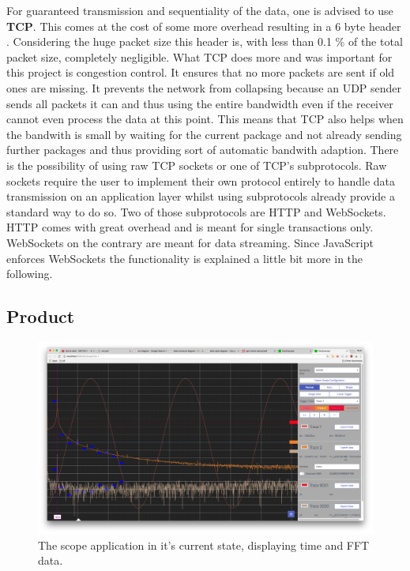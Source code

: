 For guaranteed transmission and sequentiality of the data, one is advised to use \textbf{TCP}. This comes at the cost of some more overhead resulting in a 6 byte header \cite{TODO: refrence}. Considering the huge packet size this header is, with less than 0.1 \% of the total packet size, completely negligible. What TCP does more and was important for this project is congestion control. It ensures that no more packets are sent if old ones are missing. It prevents the network from collapsing because an UDP sender sends all packets it can and thus using the entire bandwidth even if the receiver cannot even process the data at this point.
This means that TCP also helps when the bandwith is small by waiting for the current package and not already sending further packages and thus providing sort of automatic bandwith adaption.
There is the possibility of using raw TCP sockets or one of TCP's subprotocols. Raw sockets require the user to implement their own protocol entirely to handle data transmission on an application layer whilst using subprotocols already provide a standard way to do so.
Two of those subprotocols are HTTP and WebSockets. HTTP comes with great overhead and is meant for single transactions only.
WebSockets on the contrary are meant for data streaming.
Since JavaScript enforces WebSockets the functionality is explained a little bit more in the following.

%
%

\subsection{Product}

\begin{figure}
    \centering
    \includegraphics[width=\textwidth]{images/gui/scope}
    \caption[The scope application]{%
        The scope application in it's current state, displaying time and FFT data.%
    }
    \label{fig:gui:structure}
\end{figure}

